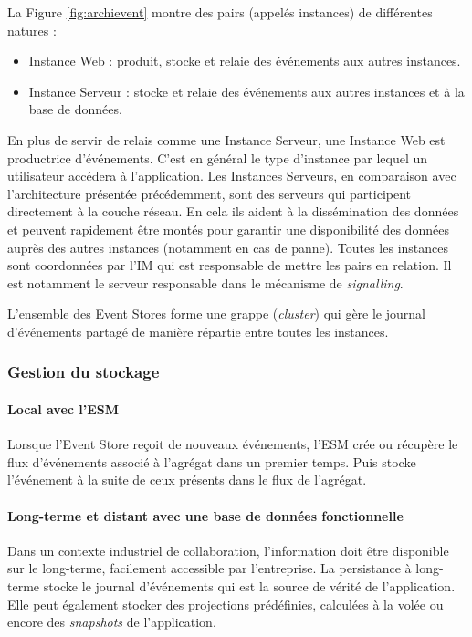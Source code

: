 La Figure \ref{fig:archievent} montre des pairs (appelés instances) de différentes 
natures :
\begin{itemize}
	\item Instance Web :  produit, stocke et relaie des événements aux autres 
	instances.
	\item Instance Serveur : stocke et relaie des événements aux autres instances 
	et à la base de données. 
\end{itemize}

En plus de servir de relais comme une Instance Serveur, une Instance Web est 
productrice d'événements. C'est en général le type d'instance par lequel un 
utilisateur accédera à l'application. Les Instances Serveurs, en comparaison avec 
l'architecture présentée précédemment, sont des \og serveurs\fg{} qui participent 
directement à la couche réseau. En cela ils aident à la dissémination des données 
et peuvent rapidement être montés pour garantir une disponibilité des données 
auprès des autres instances (notamment en cas de panne).
Toutes les instances sont coordonnées par l'\gls{IM} qui est responsable de mettre 
les pairs en relation. Il est notamment le serveur responsable dans le mécanisme 
de \textit{signalling}. 

L'ensemble des Event Stores forme une grappe (\textit{cluster}) qui gère le 
journal d'événements partagé de manière répartie entre toutes les instances.
\subsubsection{Gestion du stockage}
\paragraph{Local avec l'\gls{ESM}}
Lorsque l'Event Store reçoit de nouveaux événements, l'\gls{ESM} crée ou 
récupère le flux d'événements associé à l'agrégat dans un premier temps. Puis 
stocke l'événement à la suite de ceux présents dans le flux de l'agrégat.

\paragraph{Long-terme et distant avec une base de données fonctionnelle}
Dans un contexte industriel de collaboration, l'information doit être disponible sur le 
long-terme, facilement accessible par l'entreprise. La persistance à 
long-terme stocke le journal d'événements qui est la 
source de vérité de l'application. Elle peut également stocker des projections 
prédéfinies, calculées à la volée ou encore des \textit{snapshots} de l'application.

